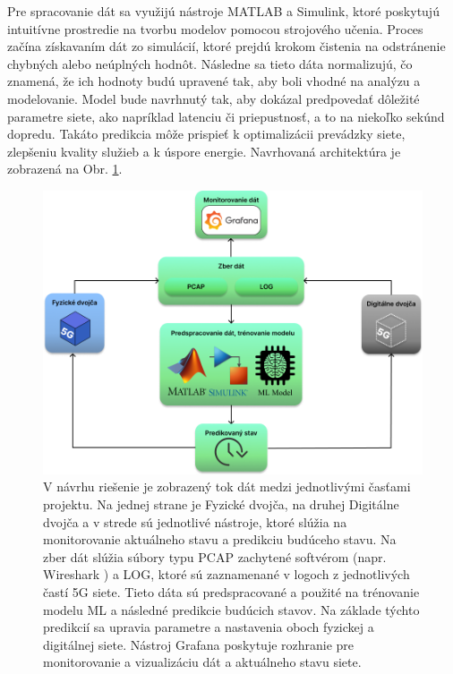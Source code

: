 \par{
Pre spracovanie dát sa využijú nástroje MATLAB a Simulink, ktoré poskytujú intuitívne prostredie na tvorbu modelov pomocou strojového učenia. Proces začína získavaním dát zo simulácií, ktoré prejdú krokom čistenia na odstránenie chybných alebo neúplných hodnôt. Následne sa tieto dáta normalizujú, čo znamená, že ich hodnoty budú upravené tak, aby boli vhodné na analýzu a modelovanie. Model bude navrhnutý tak, aby dokázal predpovedať dôležité parametre siete, ako napríklad latenciu či priepustnosť, a to na niekoľko sekúnd dopredu. Takáto predikcia môže prispieť k optimalizácii prevádzky siete, zlepšeniu kvality služieb a k úspore energie. Navrhovaná architektúra je zobrazená na Obr. \ref{fig:solution}. \\
}


\begin{figure}[H]
    \centering
    \includegraphics[width=0.85\linewidth]{assets/images/high-level-model.png}
    \caption[Návrh riešenia (High level)]{V návrhu riešenie je zobrazený tok dát medzi jednotlivými časťami projektu. Na jednej strane je Fyzické dvojča, na druhej Digitálne dvojča a v strede sú jednotlivé nástroje, ktoré slúžia na monitorovanie aktuálneho stavu a predikciu budúceho stavu. Na zber dát slúžia súbory typu PCAP zachytené softvérom (napr. Wireshark \cite{wireshark}) a LOG, ktoré sú zaznamenané v logoch z jednotlivých častí 5G siete. Tieto dáta sú predspracované a použité na trénovanie modelu ML a následné predikcie budúcich stavov. Na základe týchto predikcií sa upravia parametre a nastavenia oboch fyzickej a digitálnej siete. Nástroj Grafana \cite{grafana} poskytuje rozhranie pre monitorovanie a vizualizáciu dát a aktuálneho stavu siete.}
    \label{fig:solution}
\end{figure}

